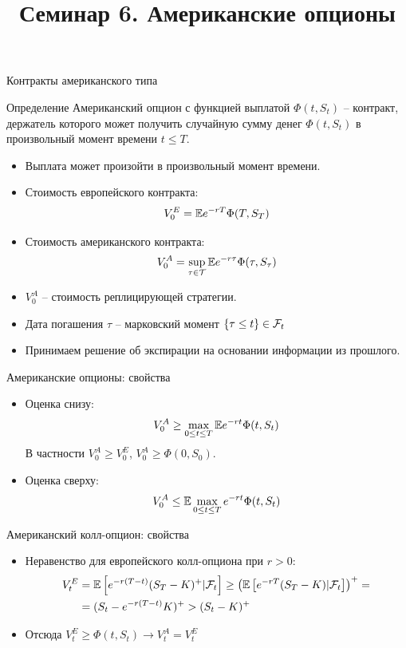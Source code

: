 \documentclass[aspectratio=169]{beamer}
\title[Американские опцион]{Семинар 6. Американские опционы} %
\begin{document}
\begin{frame}
\titlepage 
\end{frame}

\begin{frame}{Контракты американского типа}

    \begin{block}{Определение}
        Американский опцион с функцией выплатой $\Phi(t, S_t)$ -- контракт, 
        держатель которого может получить случайную сумму денег $\Phi(t, S_t)$ в произвольный момент времени $t \leq T$.
    \end{block}

    \begin{itemize}
        \item Выплата может произойти в произвольный момент времени.
        \item Стоимость европейского контракта:
        $$
            V_0^E = \mathbb{E} e^{-rT} \Phi(T, S_T)
        $$
        \item Стоимость американского контракта:
        $$
            V_0^A = \sup_{\tau \in \mathcal{T}} \mathbb{E} e^{-r\tau} \Phi(\tau, S_{\tau})
        $$
        \item $V_0^A$ -- стоимость реплицирующей стратегии.
        \item Дата погашения $\tau$ -- марковский момент $\{\tau \leq t\} \in \mathcal{F}_t$
        \item Принимаем решение об экспирации на основании информации из прошлого.    
    \end{itemize}
\end{frame}


\begin{frame}{Американские опционы: свойства}
    \begin{itemize}
        \item Оценка снизу:
        $$
            V_0^A \geq \max_{0\leq t \leq T} \mathbb{E} e^{-rt} \Phi(t, S_{t})
        $$В частности $V_0^A \geq V_0^E$, $V_0^A \geq \Phi(0, S_0)$.
        \item Оценка сверху:
        $$
            V_0^A \leq \mathbb{E} \max_{0 \leq t \leq T} e^{-rt} \Phi(t, S_{t})
        $$
    \end{itemize}
\end{frame}

\begin{frame}{Американский колл-опцион: свойства}
    \begin{itemize}
        \item Неравенство для европейского колл-опциона при $r>0$:
        \begin{align*}
            V_t^E &= \mathbb{E}\left[e^{-r(T-t)} (S_T - K)^+ | \mathcal{F}_t \right]
            \geq \left(\mathbb{E}\left[e^{-rT}(S_T - K)| \mathcal{F}_t \right]\right)^+ = \\
            &= (S_t - e^{-r(T-t)}K)^+ > (S_t - K)^+
        \end{align*}
        \item Отсюда $V_t^E \geq \Phi(t, S_t) \to V_t^A = V_t^E$
    \end{itemize}
\end{frame}
\end{document}
